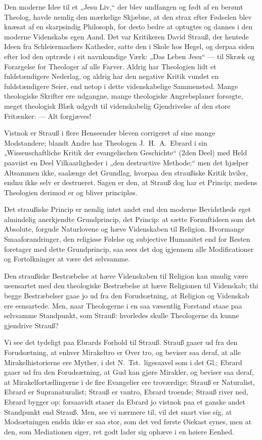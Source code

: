 \documentclass[12pt,a4paper]{book}
\newcommand{\opage}[1]{\marginnote{\footnotesize\textit{[#1]}}}
\begin{document}
Den moderne Idee til et „Jesu Liv,“ der blev undfangen og født af en
berømt Theolog, havde nemlig den mærkelige Skjæbne, at den strax efter
Fødselen blev knæsat af en skarpsindig Philosoph, for desto bedre at
optugtes og dannes i den moderne Videnskabs egen Aand. Det var
Kritikeren David Strauß, der hentede Ideen fra Schleiermachers Katheder,
satte den i
\opage{82} Skole hos Hegel, og derpaa siden efter lod den optræde i sit navnkundige
Værk: „Das Leben Jesu“ --- til Skræk og Forargelse for Theologer af alle
Farver. Aldrig har Theologien lidt et fuldstændigere Nederlag, og aldrig
har den negative Kritik vundet en fuldstændigere Seier, end netop i dette
videnskabelige Sammenstød. Mange theologiske Skrifter ere udgangne,
mange theologiske Angrebsplaner forsøgte, meget theologisk Blæk udgydt
til videnskabelig Gjendrivelse af den store Fritænker: --- Alt forgjæves!

Vistnok er Strauß i flere Henseender bleven corrigeret af sine mange
Modstandere; blandt Andre har Theologen J.\ H.\ A.\ Ebrard i sin
„Wissenschaftliche Kritik der evangelischen Geschichte“ (2den Deel) med
Held paaviist en Deel Vilkaarligheder i „den destructive Methode;“ men
det hjælper Altsammen ikke, saalænge det Grundlag, hvorpaa den
straußiske Kritik hviler, endnu ikke selv er destrueret. Sagen er den,
at Strauß dog har et Princip; medens Theologien derimod er og bliver
principløs.

Det straußiske Princip er nemlig intet andet end den moderne Bevidstheds
eget almindelig anerkjendte Grundprincip, det Princip: at sætte
Fornuftideen som det Absolute, forgude Naturlovene og hæve Videnskaben
til Religion. Hvormange Smaaforandringer, den religiøse Følelse og
subjective Humanitet end for Resten foretager med dette Grundprincip, saa
sees det dog igjennem alle Modificationer og Fortolkninger at være det
selvsamme.

Den straußiske Bestræbelse at hæve Videnskaben til Religion kan umulig
være ueensartet med den theologiske Bestræbelse at hæve Religionen til
Videnskab; thi begge Bestræbelser gaae jo ud fra den Forudsætning, at
Religion og Videnskab ere eensartede. Men, naar Theologerne i en saa
væsentlig Forstand staae paa selvsamme Standpunkt, som Strauß: hvorledes
skulle Theologerne da kunne gjendrive Strauß?

Vi see det tydeligt paa Ebrards Forhold til Strauß. Strauß gaaer ud fra
den Forudsætning, at enhver Mirakeltro er Over%
\opage{83}tro, og beviser saa deraf, at alle Mirakelhistorierne ere Myther, i det
N.\ Tst.\ ligesaavel som i det Gl.; Ebrard gaaer ud fra den
Forudsætning, at Gud kan gjøre Mirakler, og beviser saa deraf, at
Mirakelfortællingerne i de fire Evangelier ere troværdige; Strauß er
Naturalist, Ebrard er Supranaturalist; Strauß er vantro, Ebrard troende;
Strauß river ned, Ebrard bygger op: forsaavidt staaer da Ebrard jo
vistnok paa et ganske andet Standpunkt end Strauß. Men, see vi nærmere
til, vil det snart vise sig, at Modsætningen endda ikke er saa stor, som
det ved første Øiekast synes, men at den, som Mediationen siger, ret godt
lader sig ophæve i en høiere Eenhed.
\end{document}
